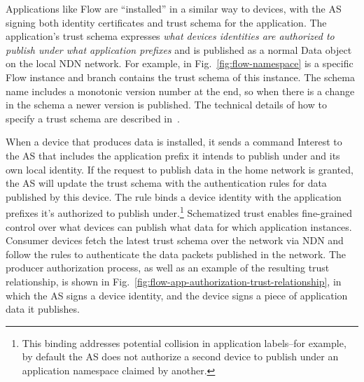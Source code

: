 Applications like Flow are ``installed'' in a similar way to devices, with the AS signing both identity certificates and trust schema for the application.  The application's trust schema  expresses \textit{what devices identities are authorized to publish under what application prefixes} and is published as a normal Data object on the local NDN network.  For example, in Fig.~\ref{fig:flow-namespace}  is a specific Flow instance and  branch contains the trust schema of this instance.
The schema name includes a monotonic version number at the end, so when there is a change in the schema a newer version is published.
The technical details of how to specify a trust schema are described in~\cite{trust-schema}.


When a device that produces data is installed, it sends a command Interest to the AS that includes the application prefix it intends to publish under and its own local identity.
If the request to publish data in the home network is granted, the AS will update the trust schema with the authentication rules for data published by this device. The rule binds a device identity with the application prefixes it's authorized to publish under.\footnote{This binding addresses potential collision in application labels--for example, by default the AS does not authorize a second device to publish under an application namespace claimed by another.}
Schematized trust enables fine-grained control over what devices can publish what data for which application instances. Consumer devices fetch the latest trust schema over the network via NDN and follow the rules to authenticate the data packets published in the network.
The producer authorization process, as well as an example of the resulting trust relationship, is shown in Fig.~\ref{fig:flow-app-authorization-trust-relationship}, in which the AS signs a device identity, and the device signs a piece of application data it publishes.


